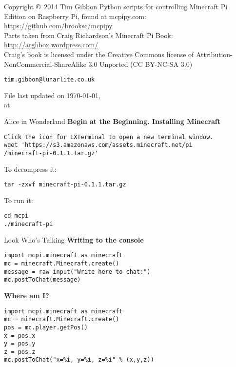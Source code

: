\documentclass[avery5388,grid]{flashcards}
\begin{document}
\begin{flashcard}{Copyright \copyright \, 2014 Tim Gibbon }
Python scripts for controlling Minecraft Pi Edition on Raspberry Pi, found at mcpipy.com: \url{https://github.com/brooksc/mcpipy}\\
Parts taken from Craig Richardson's Minecraft Pi Book: \url{http://arghbox.wordpress.com/}\\
Craig's book is licensed under the Creative Commons license of Attribution-NonCommercial-ShareAlike 3.0 Unported (CC BY-NC-SA 3.0)
\begin{center}
\begin{small}\tt tim.gibbon@lunarlite.co.uk\end{small}

\medskip
File last updated on \today, \\
at \currenttime
\end{center}
\end{flashcard}



\lstset{language=Python}
\begin{flashcard}[API]{Alice in Wonderland}
{\bf Begin at the Beginning. Installing Minecraft }
\begin{lstlisting}
Click the icon for LXTerminal to open a new terminal window.
wget 'https://s3.amazonaws.com/assets.minecraft.net/pi
/minecraft-pi-0.1.1.tar.gz'
\end{lstlisting}
To decompress it:
 \begin{lstlisting}
tar -zxvf minecraft-pi-0.1.1.tar.gz
\end{lstlisting}
To run it: 
 \begin{lstlisting}
cd mcpi
./minecraft-pi
\end{lstlisting}
\end{flashcard}

\begin{flashcard}[API]{Look Who's Talking}
{\bf Writing to the console}
\begin{lstlisting}
import mcpi.minecraft as minecraft
mc = minecraft.Minecraft.create()
message = raw_input("Write here to chat:")
mc.postToChat(message)
\end{lstlisting}
{\bf Where am I?}
\begin{lstlisting}
import mcpi.minecraft as minecraft
mc = minecraft.Minecraft.create()
pos = mc.player.getPos()
x = pos.x
y = pos.y
z = pos.z
mc.postToChat("x=%i, y=%i, z=%i" % (x,y,z))
\end{lstlisting}
\end{flashcard}
\end{document}
